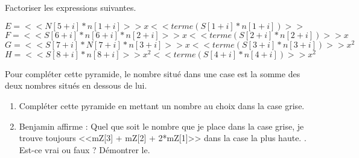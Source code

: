 \begin{multicols}{2}




Factoriser les expressions suivantes.

\begin{multicols}{2}
$E=  <<N[5+i] * n[1+i]>> x  <<terme(S[1+i] * n[1+i])>>$\\
$F=  <<S[6+i] *n[6+i] * n[2+i]>> x  <<terme(S[2+i] * n[2+i])>> x$\\
$G=  <<S[7+i] *N[7+i] * n[3+i]>> x  <<terme(S[3+i] * n[3+i])>> x^2$\\
$H=  <<S[8+i] *n[8+i] >> x^2  <<terme(S[4+i] *n[4+i] )>> x^2$
\end{multicols}


\raggedcolumns
\end{multicols}

\exon{}

\begin{minipage}{0.4\linewidth}
	\begin{center}
\end{center}
\end{minipage}
\begin{minipage}{0.6\linewidth}
Pour compléter cette pyramide, le nombre situé dans une case est la somme des deux nombres situés en dessous de lui.

\begin{enumerate}
	\item Compléter cette pyramide en mettant un nombre au choix dans la case grise.
	\item Benjamin affirme : \og{} Quel que soit le nombre que je place dans la case grise, je trouve toujours <<mZ[3] + mZ[2] + 2*mZ[1]>> dans la case la plus haute. \fg{}. Est-ce vrai ou faux ? Démontrer le.
\end{enumerate}
\end{minipage}


